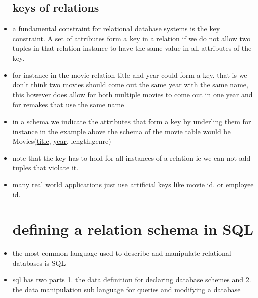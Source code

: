 \documentclass{article}
\begin{document}
\begin{itemize}
\subsection{keys of relations}
\item a fundamental constraint for relational database systems is the key constraint. A set of attributes form a key in a relation if we do not allow two tuples in that relation instance to have the same value in all attributes of the key. 
\item for instance in the movie relation title and year could form a key. that is we don't think two movies should come out the same year with the same name, this however does allow for both multiple movies to come out in one year and for remakes that use the same name 
\item in a schema we indicate the attributes that form a key by underling them for instance in the example above the schema of the movie table would be Movies(\underline{title}, \underline{year}, length,genre)
\item note that the key has to hold for all instances of a relation ie we can not add tuples that violate it. 
\item many real world applications just use artificial keys like movie id. or employee id.
\section{defining a relation schema in SQL}
\item the most common language used to describe and manipulate relational databases is SQL
\item sql has two parts 1. the data definition for declaring database schemes and 2. the data manipulation sub language for queries and modifying a database

\end{itemize}
\end{document}
